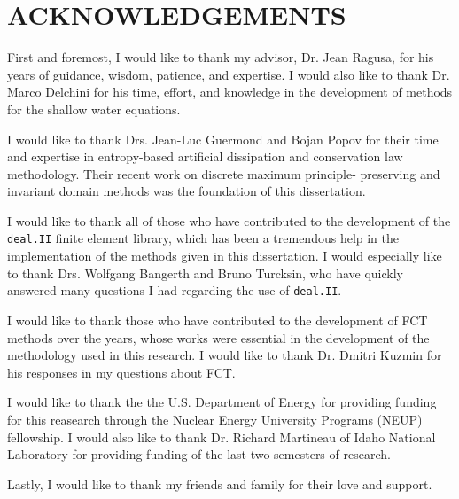 \chapter*{ACKNOWLEDGEMENTS}

\indent
First and foremost, I would like to thank my advisor, Dr. Jean Ragusa,
for his years of guidance, wisdom, patience, and expertise. I would also like to
thank Dr. Marco Delchini for his time, effort, and
knowledge in the development of methods for the shallow water equations.

I would like to thank Drs. Jean-Luc Guermond and Bojan Popov for their
time and expertise in entropy-based artificial dissipation and
conservation law methodology. Their recent work on discrete maximum principle-
preserving and invariant domain methods was the foundation of this dissertation.

I would like to thank all of those who have contributed to the
development of the \texttt{deal.II} finite element library, which has been
a tremendous help in the implementation of the methods given in this
dissertation. I would especially like to thank Drs. Wolfgang Bangerth
and Bruno Turcksin, who have quickly answered many questions I had regarding
the use of \texttt{deal.II}.

I would like to thank those who have contributed to the development
of FCT methods over the years, whose works were essential in the development
of the methodology used in this research. I would like to thank Dr. Dmitri Kuzmin
for his responses in my questions about FCT.

I would like to thank the the U.S. Department of Energy for providing
funding for this reasearch through the Nuclear Energy University
Programs (NEUP) fellowship. I would also like to thank Dr. Richard
Martineau of Idaho National Laboratory for providing funding of
the last two semesters of research.

Lastly, I would like to thank my friends and family for their love and support.

\pagebreak{}
